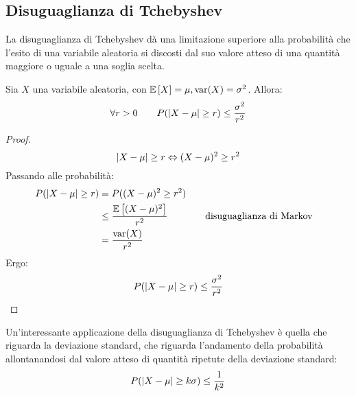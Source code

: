 \subsection{Disuguaglianza di Tchebyshev}
La disuguaglianza di Tchebyshev dà una limitazione superiore alla probabilità che l'esito di una variabile aleatoria si discosti dal suo valore atteso di una quantità maggiore o uguale a una soglia scelta.
\begin{teor}
	Sia $X$ una variabile aleatoria, con $\mathbb{E}\left[ X \right]=\mu, \operatorname{var}(X)=\sigma^2$. Allora:
	\begin{equation*}
		\forall r>0\qquad P(\left\lvert X-\mu \right\rvert\geq r)\leq \frac{\sigma^2}{r^2}
	\end{equation*}
\end{teor}
\begin{proof}
	\begin{equation*}
		\left\lvert X-\mu \right\rvert\geq r \Leftrightarrow (X-\mu)^2 \geq r^2
	\end{equation*}
	Passando alle probabilità:
	\begin{align*}
		P(\left\lvert X-\mu \right\rvert\geq r) & = P((X-\mu)^2 \geq r^2)                                       \\
		                     & \leq \frac{\mathbb{E}\left[ (X-\mu)^2 \right]}{r^2} & \quad & \text{disuguaglianza di Markov} \\
		                     & =\frac{\operatorname{var}(X)}{r^2}
	\end{align*}
	Ergo:
	\begin{equation*}
		P(\left\lvert X-\mu \right\rvert\geq r)\leq \frac{\sigma^2}{r^2}
	\end{equation*}
\end{proof}

Un'interessante applicazione della disuguaglianza di Tchebyshev è quella che riguarda la deviazione standard, che riguarda l'andamento della probabilità allontanandosi dal valore atteso di quantità ripetute della deviazione standard:
\begin{equation*}
	P(\left\lvert X-\mu \right\rvert\geq k\sigma)\leq\frac{1}{k^2}
\end{equation*}
